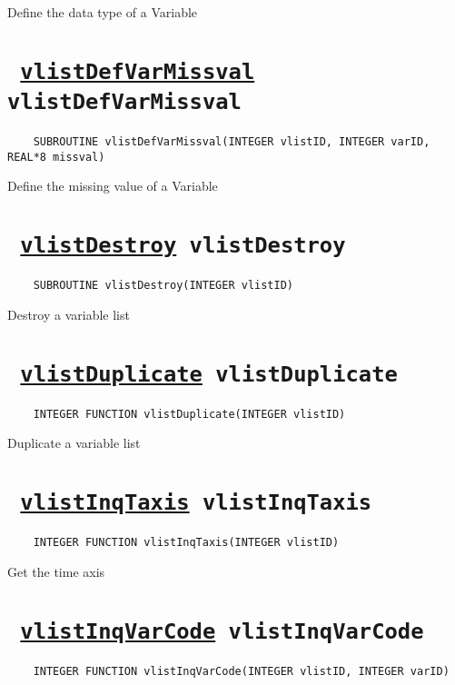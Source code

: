 Define the data type of a Variable
\ifpdfoutput{}{(\ref{vlistDefVarDatatype})}


\section*{\texttt{ 
\ifpdf
\hyperref[vlistDefVarMissval]{vlistDefVarMissval}
\else
vlistDefVarMissval
\fi
}}
\begin{verbatim}
    SUBROUTINE vlistDefVarMissval(INTEGER vlistID, INTEGER varID, REAL*8 missval)
\end{verbatim}

Define the missing value of a Variable
\ifpdfoutput{}{(\ref{vlistDefVarMissval})}


\section*{\texttt{ 
\ifpdf
\hyperref[vlistDestroy]{vlistDestroy}
\else
vlistDestroy
\fi
}}
\begin{verbatim}
    SUBROUTINE vlistDestroy(INTEGER vlistID)
\end{verbatim}

Destroy a variable list
\ifpdfoutput{}{(\ref{vlistDestroy})}


\section*{\texttt{ 
\ifpdf
\hyperref[vlistDuplicate]{vlistDuplicate}
\else
vlistDuplicate
\fi
}}
\begin{verbatim}
    INTEGER FUNCTION vlistDuplicate(INTEGER vlistID)
\end{verbatim}

Duplicate a variable list
\ifpdfoutput{}{(\ref{vlistDuplicate})}


\section*{\texttt{ 
\ifpdf
\hyperref[vlistInqTaxis]{vlistInqTaxis}
\else
vlistInqTaxis
\fi
}}
\begin{verbatim}
    INTEGER FUNCTION vlistInqTaxis(INTEGER vlistID)
\end{verbatim}

Get the time axis
\ifpdfoutput{}{(\ref{vlistInqTaxis})}


\section*{\texttt{ 
\ifpdf
\hyperref[vlistInqVarCode]{vlistInqVarCode}
\else
vlistInqVarCode
\fi
}}
\begin{verbatim}
    INTEGER FUNCTION vlistInqVarCode(INTEGER vlistID, INTEGER varID)
\end{verbatim}

